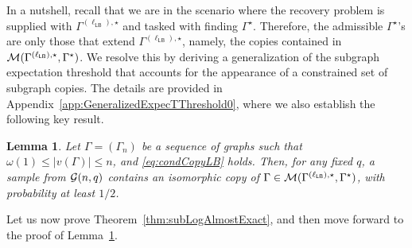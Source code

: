 \documentclass[12pt]{article}
\newtheorem{lemma}{Lemma}
\newcommand{\calG}{{\cal G}}
\newcommand{\calM}{{\cal M}}
\newcommand{\s}[1]{\mathsf{#1}}
\begin{document}
In a nutshell, recall that we are in the scenario where the recovery problem is supplied with $\Gamma^{(\ell_{\s{LB}}),\star}$ and tasked with finding $\Gamma^\star$. Therefore, the admissible $\Gamma^\star$'s are only those that extend $\Gamma^{(\ell_{\s{LB}}),\star}$, namely, the copies contained in $\calM(\Gamma^{(\ell_{\s{LB}}),\star},\Gamma^\star)$. We resolve this by deriving a generalization of the subgraph expectation threshold that accounts for the appearance of a constrained set of subgraph copies. The details are provided in Appendix~\ref{app:GeneralizedExpecTThreshold0}, where we also establish the following key result.
\begin{lemma}
\label{lem:sublogProbLB}
Let $\Gamma=(\Gamma_n)$ be a sequence of graphs such that $\omega(1) \leq |v(\Gamma)|\leq n $, and
\eqref{eq:condCopyLB} holds. Then, for any fixed $q$, a sample from $\calG(n,q)$ contains an isomorphic copy of $\Gamma\in\calM(\Gamma^{(\ell_{\s{LB}}),\star},\Gamma^\star)$, with probability at least $1/2$.
\end{lemma}
Let us now prove Theorem~\ref{thm:subLogAlmostExact}, and then move forward to the proof of Lemma~\ref{lem:sublogProbLB}.
\end{document}

